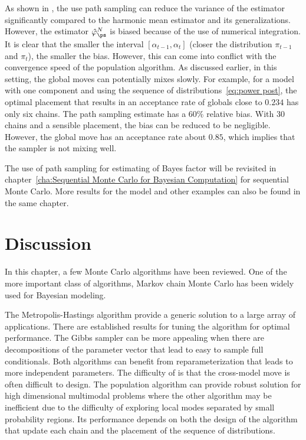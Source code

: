 As shown in \cite{Calderhead:2009bd}, the use path sampling can reduce the
variance of the estimator significantly compared to the harmonic mean
estimator and its generalizations. However, the estimator
$\hat\varphi_{\ps}^N$ is biased because of the use of numerical integration.
It is clear that the smaller the interval $[\alpha_{t-1},\alpha_t]$ (closer
the distribution $\pi_{t-1}$ and $\pi_t$), the smaller the bias. However, this
can come into conflict with the convergence speed of the population \mcmc
algorithm. As discussed earlier, in this setting, the global moves can
potentially mixes slowly. For example, for a \pet model with one component and
using the sequence of distributions~\eqref{eq:power post}, the optimal
placement that results in an acceptance rate of globals close to $0.234$ has
only six chains. The path sampling estimate has a 60\% relative bias. With 30
chains and a sensible placement, the bias can be reduced to be negligible.
However, the global move has an acceptance rate about $0.85$, which implies
that the sampler is not mixing well.

The use of path sampling for estimating of Bayes factor will be revisited in
chapter~\ref{cha:Sequential Monte Carlo for Bayesian Computation} for
sequential Monte Carlo. More results for the \pet model and other examples can
also be found in the same chapter.

\section{Discussion}
\label{sec:Monte Carlo Discussion}

In this chapter, a few Monte Carlo algorithms have been reviewed. One of the
more important class of algorithms, Markov chain Monte Carlo has been widely
used for Bayesian modeling.

The Metropolis-Hastings algorithm provide a generic solution to a large array
of applications. There are established results for tuning the algorithm for
optimal performance. The Gibbs sampler can be more appealing when there are
decompositions of the parameter vector that lead to easy to sample full
conditionals. Both algorithms can benefit from reparameterization that leads
to more independent parameters. The difficulty of \rjmcmc is that the
cross-model move is often difficult to design. The population \mcmc algorithm
can provide robust solution for high dimensional multimodal problems where the
other algorithm may be inefficient due to the difficulty of exploring local
modes separated by small probability regions. Its performance depends on both
the design of the \mcmc algorithm that update each chain and the placement of
the sequence of distributions.

